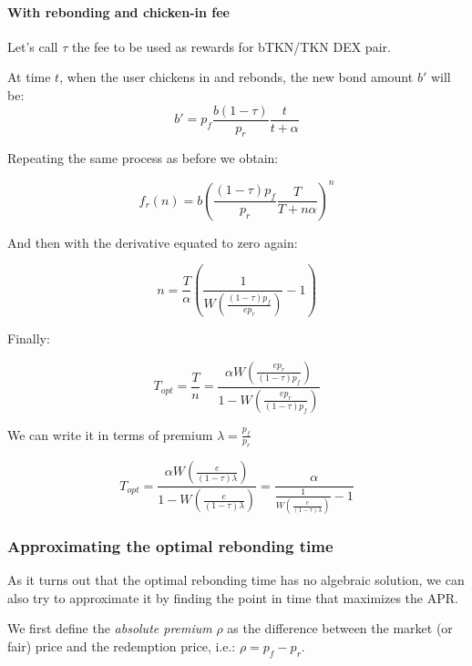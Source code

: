 \documentclass{article}
\begin{document}
\paragraph{With rebonding and chicken-in fee}
Let’s call $\tau$ the fee to be used as rewards for bTKN/TKN DEX pair.

At time $t$, when the user chickens in and rebonds, the new bond amount $b'$ will be:
\begin{equation}
b'= p_f\frac{b(1-\tau)}{p_r}\frac{t}{t+\alpha}
\end{equation}

Repeating the same process as before we obtain:

\begin{equation}
  \label{eq:n-rebond_3}
f_r(n) = b \left(\frac{(1-\tau)p_f}{p_r} \frac{T}{T+n \alpha} \right)^{n}
\end{equation}

And then with the derivative equated to zero again:

\[
n = \frac{T}{\alpha} \left(\frac{1}{W\left(\frac{(1-\tau)p_f}{e p_r} \right)} - 1\right)
\]

Finally:

\begin{equation}
  \label{}
T_{opt} = \frac{T}{n} = \frac{\alpha W\left(\frac{e p_r}{(1-\tau)p_f}\right)}{1 - W\left(\frac{e p_r}{(1-\tau)p_f}\right)}
\end{equation}

We can write it in terms of premium $\lambda = \frac{p_f}{p_r}$

\begin{equation}
  \label{eq:opt-rebonding-fee-premium}
T_{opt} = \frac{\alpha W\left(\frac{e}{(1-\tau)\lambda}\right)}{1 - W\left(\frac{e}{(1-\tau)\lambda}\right)} = \frac{\alpha}{\frac{1}{W\left(\frac{e}{(1-\tau)\lambda}\right)} - 1}
\end{equation}

\subsubsection{Approximating the optimal rebonding time}
As it turns out that the optimal rebonding time has no algebraic solution, we can also try to approximate it by finding the point in time that maximizes the APR.

We first define the \textit{absolute premium} $\rho$ as the difference between the market (or fair) price and the redemption price, i.e.: $\rho = p_f - p_r$.
\end{document}
